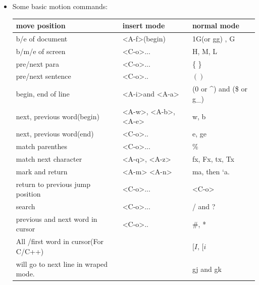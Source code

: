 \documentclass[a4paper,12pt,twoside]{book}
\begin{document}
\begin{itemize}
	\item Some basic motion commands: 
	\begin{center}
		\begin{tabular}{p{}|p{}|p{}}
		\hline 
        move position & insert mode & normal mode \\

		\hline
		b/e of document &  <A-f>(begin)  & 1G(or gg) , G  \\

	    \hline 
		b/m/e of screen & <C-o>... & H, M, L \\

		\hline 
		pre/next para & <C-o>... &\{ \} \\

		\hline 
		pre/next sentence & <C-o>.. & $( )$ \\
		
		\hline 
		begin, end of line &<A-i>and <A-a> & (0 or \^{}) and (\$ or g\_)  \\
		
	   	\hline 		
		next, previous word(begin) &<A-w>, <A-b>,<A-e>  & w, b\\   

	    \hline
	    next, previous word(end) & <C-o>.. & e, ge \\
 	
         \hline 		
         match parenthes & <C-o>... & \%   \\
         
         \hline 
		 match next character &<A-q>, <A-z>& fx, Fx, tx, Tx \\
         
        \hline  
		mark and return & <A-m> <A-n> & ma, then `a. \\
        
        \hline 
		return to previous jump position & <C-o>... & <C-o> \\    
      				
		\hline
        search &<C-o>...  & / and ? \\

       \hline       
		previous and next word in cursor & <C-o>.. & \#, * \\

		\hline 
		All /first word in cursor(For C/C++) &  & $[I$, $[i$  \\ 

		\hline 
		will go to next line in wraped mode. & &  gj and gk \\
		\hline 


\end{tabular}
\end{center}
\end{itemize}
\end{document}

